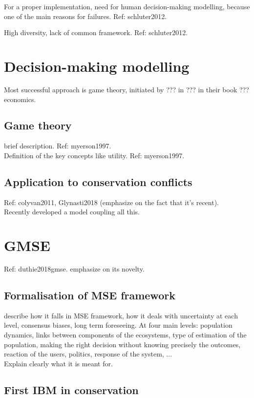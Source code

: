 \documentclass[12pt,a4paper]{article}
\begin{document}
For a proper implementation, need for human decision-making modelling, because one of the main reasons for failures. Ref: schluter2012.

High diversity, lack of common framework. Ref: schluter2012.\\

\section{Decision-making modelling}

Most successful approach is game theory, initiated by ??? in ??? in their book ??? economics.

\subsection{Game theory}
brief description. Ref: myerson1997.\\
Definition of the key concepts like utility. Ref: myerson1997.

\subsection{Application to conservation conflicts}
Ref: colyvan2011, Glynasti2018 (emphasize on the fact that it's recent).\\

Recently developed a model coupling all this.
\section{GMSE} Ref: duthie2018gmse. emphasize on its novelty.

\subsection{Formalisation of MSE framework}

describe how it falls in MSE framework, how it deals with uncertainty at each level, consensus biases, long term foreseeing.
At four main levels: population dynamics, links between components of the ecosystems, type of estimation of the population, making the right decision without knowing precisely the outcomes, reaction of the users, politics, response of the system, ...\\
Explain clearly what it is meant for.

\subsection{First IBM in conservation}
\end{document}
